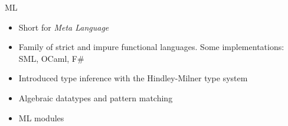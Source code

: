 \documentclass[pdf]{beamer}
\begin{document}
\begin{frame}{ML}
  \begin{figure}[H]
    \centering
    \hspace{0.3cm}
    \hspace{0.3cm}
    \hspace{0.3cm}
    \hspace{0.3cm}
  \end{figure}
  \begin{itemize}
    \item Short for \emph{Meta Language}
    \item Family of strict and impure functional languages. Some implementations: SML, OCaml, F\#
    \item Introduced type inference with the Hindley-Milner type system
    \item Algebraic datatypes and pattern matching
    \item ML modules
  \end{itemize}
\end{frame}
\end{document}
